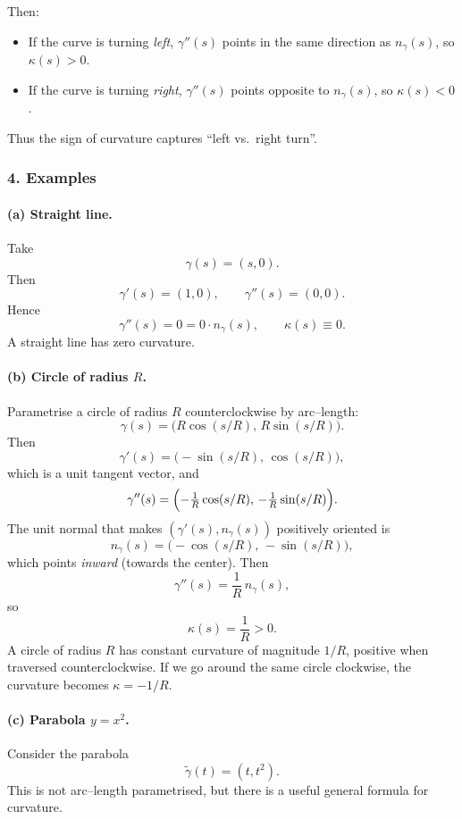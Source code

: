 \documentclass[12pt,a4paper]{article}
\theoremstyle{plain}
\theoremstyle{definition}      %
\begin{document}
	Then:
	\begin{itemize}
		\item If the curve is turning \emph{left}, $\gamma''(s)$ points in the same
		direction as $n_\gamma(s)$, so $\kappa(s)>0$.
		\item If the curve is turning \emph{right}, $\gamma''(s)$ points opposite to
		$n_\gamma(s)$, so $\kappa(s)<0$.
	\end{itemize}
	
	Thus the sign of curvature captures ``left vs.\ right turn''.
	
	\subsubsection*{4. Examples}
	
	\paragraph{(a) Straight line.}
	Take
	\[
	\gamma(s) = (s,0).
	\]
	Then
	\[
	\gamma'(s) = (1,0),\qquad \gamma''(s)=(0,0).
	\]
	Hence
	\[
	\gamma''(s)=0 = 0\cdot n_\gamma(s),\qquad \kappa(s)\equiv 0.
	\]
	A straight line has zero curvature.
	
	\medskip
	\paragraph{(b) Circle of radius $R$.}
	Parametrise a circle of radius $R$ counterclockwise by arc--length:
	\[
	\gamma(s)=\bigl(R\cos(s/R),\,R\sin(s/R)\bigr).
	\]
	Then
	\[
	\gamma'(s)=\bigl(-\sin(s/R),\,\cos(s/R)\bigr),
	\]
	which is a unit tangent vector, and
	\[
	\gamma''(s)
	= \Bigl(-\tfrac{1}{R}\cos(s/R),\,-\tfrac{1}{R}\sin(s/R)\Bigr).
	\]
	The unit normal that makes $(\gamma'(s),n_\gamma(s))$ positively oriented is
	\[
	n_\gamma(s) = \bigl(-\cos(s/R),\, -\sin(s/R)\bigr),
	\]
	which points \emph{inward} (towards the center).  Then
	\[
	\gamma''(s) = \frac{1}{R}\,n_\gamma(s),
	\]
	so
	\[
	\kappa(s)=\frac{1}{R}>0.
	\]
	A circle of radius $R$ has constant curvature of magnitude $1/R$, positive when
	traversed counterclockwise.  If we go around the same circle clockwise, the
	curvature becomes $\kappa=-1/R$.
	
	\medskip
	\paragraph{(c) Parabola $y=x^2$.}
	Consider the parabola
	\[
	\tilde\gamma(t)=(t,t^2).
	\]
	This is not arc--length parametrised, but there is a useful general formula
	for curvature.
	
\end{document}

